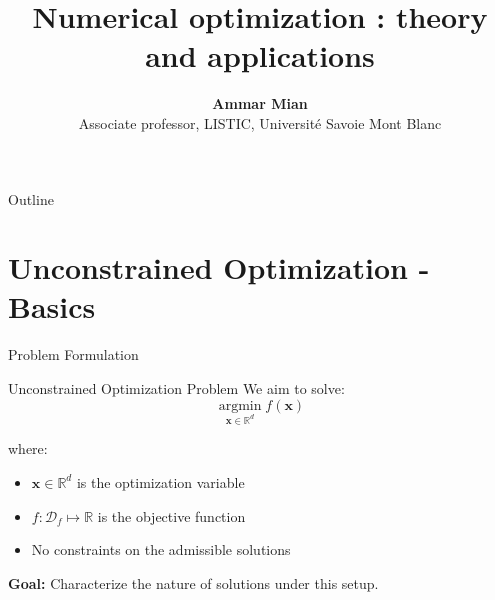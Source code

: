\documentclass[aspectratio=1610]{beamer}
\title[Numerical optimization]{Numerical optimization : theory and applications}
\date[]{}
\author[AM]{\textbf{Ammar Mian} \\ \footnotesize Associate professor, LISTIC, Université Savoie Mont Blanc}
\begin{document}


  
\begin{frame}
\titlepage
\end{frame}
\begingroup
{}
\begin{frame}{Outline}
    \tableofcontents[]
\end{frame}

\endgroup








\section{Unconstrained Optimization - Basics}

\begin{frame}{Problem Formulation}
  \begin{block}{Unconstrained Optimization Problem}
    We aim to solve:
    $$\underset{\mathbf{x}\in\mathbb{R}^d}{\operatorname{argmin}} f(\mathbf{x})$$
    
    where:
    \begin{itemize}
      \item $\mathbf{x} \in \mathbb{R}^d$ is the optimization variable
      \item $f: \mathcal{D}_f \mapsto \mathbb{R}$ is the objective function
      \item No constraints on the admissible solutions
    \end{itemize}
  \end{block}
  
  \vspace{0.5cm}
  \textbf{Goal:} Characterize the nature of solutions under this setup.
\end{frame}
\end{document}
